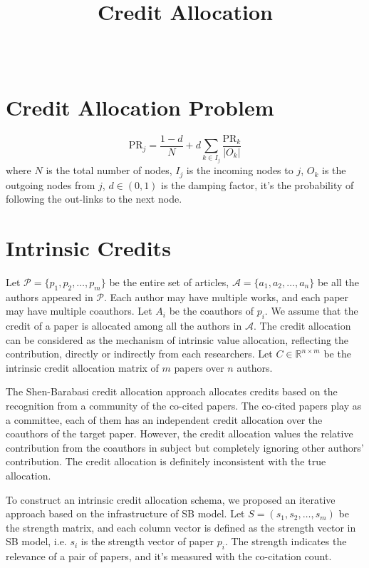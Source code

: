 \documentclass[12pt]{article}
\title{Credit Allocation}
\author{~}
\numberwithin{table}{section}
\begin{document}
\maketitle

\noindent

\section{Credit Allocation Problem}

\[
\textrm{PR}_j = \frac{1-d}{N} + d \sum_{k\in I_j} \frac{\textrm{PR}_k}{|O_k|}
\]
where $N$ is the total number of nodes, $I_j$ is the incoming nodes to $j$, $O_k$ is the outgoing nodes from $j$, $d \in(0,1)$ is the damping factor, it's the probability of following the out-links to the next node.

\section{Intrinsic Credits}
Let $\mathcal P=\{p_1,p_2,\ldots,p_m\}$ be the entire set of articles, $\mathcal A=\{a_1,a_2,\ldots,a_n\}$ be all the authors appeared in $\mathcal P$. Each author may have multiple works, and each paper may have multiple coauthors. Let $A_i$ be the coauthors of $p_i$. We assume that the credit of a paper is allocated among all the authors in $\mathcal A$. The credit allocation can be considered as the mechanism of intrinsic value allocation, reflecting the contribution, directly or indirectly from each researchers. Let $C\in \mathbb R^{n\times m}$ be the intrinsic credit allocation matrix of $m$ papers over $n$ authors.

The Shen-Barabasi credit allocation approach allocates credits based on the recognition from a community of the co-cited papers. The co-cited papers play as a committee, each of them has an independent credit allocation over the coauthors of the target paper. However, the credit allocation values the relative contribution from the coauthors in subject but completely ignoring other authors' contribution. The credit allocation is definitely inconsistent with the true allocation.

To construct an intrinsic credit allocation schema, we proposed an iterative approach based on the infrastructure of SB model. Let $S=(s_1,s_2,\ldots,s_m)$ be the strength matrix, and each column vector is defined as the strength vector in SB model, i.e. $s_i$ is the strength vector of paper $p_i$. The strength indicates the relevance of a pair of papers, and it's measured with the co-citation count. 
\end{document}
